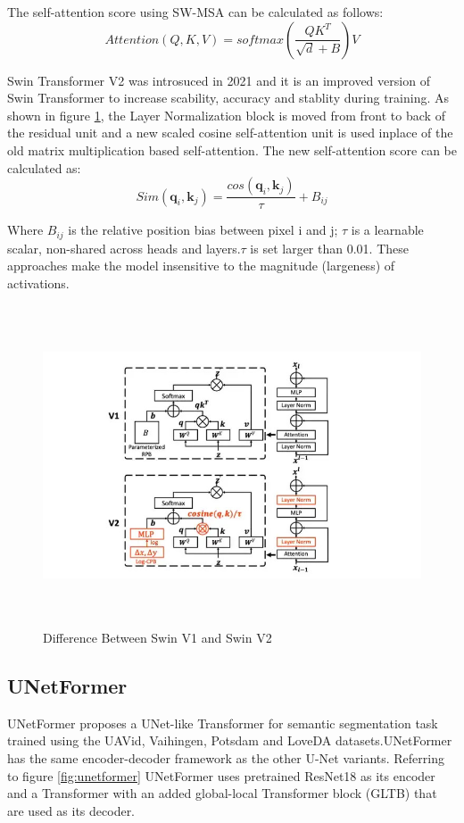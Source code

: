 The self-attention score using SW-MSA can be calculated as follows:
\begin{equation}
    Attention(Q,K,V) = softmax(\frac{QK^T}{\sqrt{d}+B})V
\end{equation}

Swin Transformer V2 \cite{swin-v2} was introsuced in 2021 and it is an improved version of Swin Transformer to increase scability, accuracy and stablity during training. As shown in figure \ref{fig:swin v1 vs v2}, the Layer Normalization block is moved from front to back of the residual unit and a new scaled cosine self-attention unit is used inplace of the old matrix multiplication based self-attention. The new self-attention score can be calculated as:
\begin{equation}
    Sim(\mathbf{q}_i,\mathbf{k}_j) = \frac{cos(\mathbf{q}_i,\mathbf{k}_j)}{\tau} + B_{ij}
\end{equation}

Where $B_{ij}$ is the relative position bias between pixel i and j; $\tau$ is a learnable scalar, non-shared across heads and layers.$\tau$ is set larger than 0.01. These approaches make the model insensitive to the magnitude (largeness) of activations.
\FloatBarrier
\begin{figure}[ht]
\includegraphics[width=13.5cm, height=9.5cm]{images/swin1-vs-swin2.jpg}
\centering
\caption{Difference Between Swin V1 and Swin V2}
\label{fig:swin v1 vs v2}
\end{figure}
\FloatBarrier

\subsection{UNetFormer}
UNetFormer \cite{unetformer} proposes a UNet-like Transformer for semantic segmentation task trained using the UAVid, Vaihingen, Potsdam and LoveDA datasets.UNetFormer has the same encoder-decoder framework as the other U-Net variants. Referring to figure \ref{fig:unetformer} UNetFormer uses pretrained ResNet18 as its encoder and a Transformer with an added global-local Transformer block (GLTB) that are used as its decoder. 

